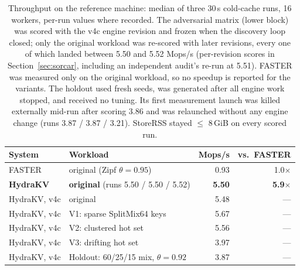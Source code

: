 \documentclass{article}
\newcommand{\FASTERBase}{0.93}          %
\newcommand{\HydraProd}{5.52}           %
\newcommand{\SpeedupFinal}{5.9$\times$}
\newcommand{\HydraOrigVFourC}{5.48}     %
\newcommand{\HydraSparse}{5.67}
\newcommand{\HydraClustered}{5.56}
\newcommand{\HydraDrift}{3.97}
\newcommand{\HydraHoldout}{3.87}
\newcommand{\HoldoutRuns}{3.87 / 3.87 / 3.21}
\newcommand{\HydraAuditVerified}{5.51}  %
\newcommand{\HydraAuditFixed}{5.50}     %
\newcommand{\HydraFinalWL}{5.50}        %
\newcommand{\HydraFinalWLRuns}{5.50 / 5.50 / 5.52}
\newcommand{\MemBudget}{8\,GiB}
\begin{document}
\begin{table}[t]
\centering
\caption{Throughput on the reference machine: median of three 30\,s cold-cache runs, 16 workers, per-run values where recorded. The adversarial matrix (lower block) was scored with the v4c engine revision and frozen when the discovery loop closed; only the original workload was re-scored with later revisions, every one of which landed between \HydraAuditFixed{} and \HydraProd{} Mops/s (per-revision scores in Section~\ref{sec:sorcar}, including an independent audit's re-run at \HydraAuditVerified). FASTER was measured only on the original workload, so no speedup is reported for the variants. The holdout used fresh seeds, was generated after all engine work stopped, and received no tuning. Its first measurement launch was killed externally mid-run after scoring 3.86 and was relaunched without any engine change (runs \HoldoutRuns). StoreRSS stayed $\leq$ \MemBudget{} on every scored run.}
\label{tab:main}
\small
\setlength{\tabcolsep}{4pt}
\begin{tabular}{@{}llrr@{}}
\toprule
\textbf{System} & \textbf{Workload} & \textbf{Mops/s} & \textbf{vs.\ FASTER} \\
\midrule
FASTER              & original (Zipf $\theta{=}0.95$)      & \FASTERBase & 1.0$\times$ \\
\textbf{HydraKV}    & \textbf{original} (runs \HydraFinalWLRuns) & \textbf{\HydraFinalWL} & \textbf{\SpeedupFinal} \\
\midrule
HydraKV, v4c        & original                             & \HydraOrigVFourC & --- \\
HydraKV, v4c        & V1: sparse SplitMix64 keys           & \HydraSparse & --- \\
HydraKV, v4c        & V2: clustered hot set                & \HydraClustered & --- \\
HydraKV, v4c        & V3: drifting hot set                 & \HydraDrift & --- \\
HydraKV, v4c        & Holdout: 60/25/15 mix, $\theta{=}0.92$ & \HydraHoldout & --- \\
\bottomrule
\end{tabular}
\end{table}
\end{document}
